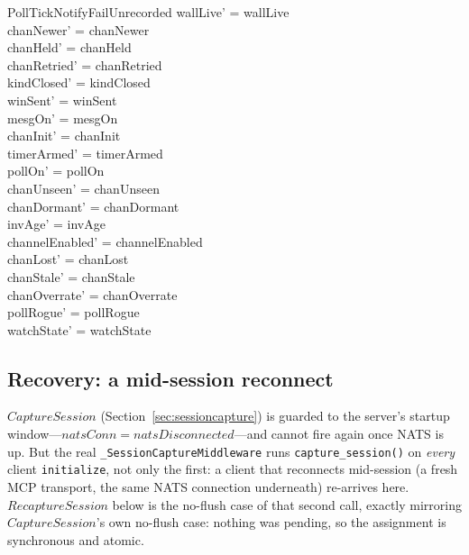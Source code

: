 \documentclass[a4paper,10pt,fleqn]{article}
\begin{document}
\begin{schema}{PollTickNotifyFailUnrecorded}
  wallLive' = wallLive \\
  chanNewer' = chanNewer \\
  chanHeld' = chanHeld \\
  chanRetried' = chanRetried \\
  kindClosed' = kindClosed \\
  winSent' = winSent \\
  mesgOn' = mesgOn \\
  chanInit' = chanInit \\
  timerArmed' = timerArmed \\
  pollOn' = pollOn \\
  chanUnseen' = chanUnseen \\
  chanDormant' = chanDormant \\
  invAge' = invAge \\
  channelEnabled' = channelEnabled \\
  chanLost' = chanLost \\
  chanStale' = chanStale \\
  chanOverrate' = chanOverrate \\
  pollRogue' = pollRogue \\
  watchState' = watchState
\end{schema}

\subsection{Recovery: a mid-session reconnect}

$CaptureSession$ (Section~\ref{sec:sessioncapture}) is guarded to the
server's startup window---$natsConn = natsDisconnected$---and cannot
fire again once NATS is up.  But the real
\texttt{\_SessionCaptureMiddleware} runs \texttt{capture\_session()} on
\emph{every} client \texttt{initialize}, not only the first: a client
that reconnects mid-session (a fresh MCP transport, the same NATS
connection underneath) re-arrives here.  $RecaptureSession$ below is
the no-flush case of that second call, exactly mirroring $CaptureSession$'s
own no-flush case: nothing was pending, so the assignment is
synchronous and atomic.
\end{document}
